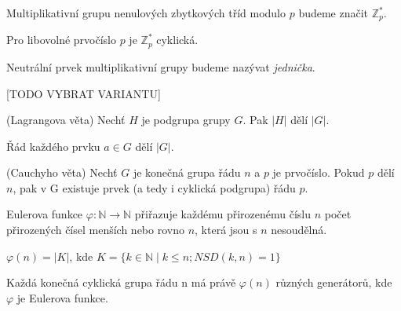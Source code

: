\documentclass[
  program=infoi,
  biblatex,
  figures=false,
  glossaries,
  index
]{kidiplom}
\begin{document}
    
    \begin{definition}\label{def:Z*p}
        Multiplikativní grupu nenulových zbytkových tříd modulo $p$ budeme značit $\mathbb{Z}^*_p$.
    \end{definition}

    \begin{theorem}
        Pro libovolné prvočíslo $p$ je $\mathbb{Z}^*_p$ cyklická.
    \end{theorem}

    \begin{definition}
        Neutrální prvek multiplikativní grupy budeme nazývat \emph{jednička}.
    \end{definition}




    [TODO VYBRAT VARIANTU]

    \begin{theorem}
        (Lagrangova věta)
        Nechť $H$ je podgrupa grupy $G$. Pak $|H|$ dělí $|G|$.
    \end{theorem}

    \begin{consequence}
        Řád každého prvku $a \in G$ dělí $|G|$.
    \end{consequence}



    \begin{theorem}
        (Cauchyho věta)
        Nechť $G$ je konečná grupa řádu $n$ a $p$ je prvočíslo.
        Pokud $p$ dělí $n$, pak v G existuje prvek (a tedy i cyklická podgrupa) řádu $p$.
    \end{theorem}





    \begin{definition}
        Eulerova funkce $\varphi: \mathbb{N} \rightarrow \mathbb{N}$ přiřazuje každému přirozenému číslu $n$
        počet přirozených čísel menších nebo rovno $n$, která jsou s $n$ nesoudělná.

        \begin{center}
            $\varphi(n) = |K|$, kde $K = \{k \in \mathbb{N} \mid k \leq n; NSD(k,n)=1\}$
        \end{center}

    \end{definition}

    \begin{theorem}\label{the:generators-count}
        Každá konečná cyklická grupa řádu n má právě $\varphi(n)$ různých generátorů, kde $\varphi$ je Eulerova funkce.
    \end{theorem}
\end{document}
